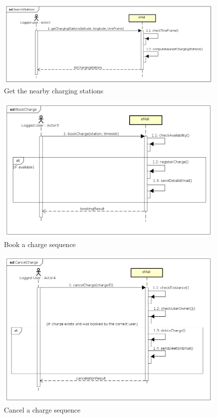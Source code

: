 \begin{figure}[!h]
    \begin{center}
        \includegraphics[keepaspectratio, width=16cm]{Sequence/SearchStations.png}
        \caption{Get the nearby charging stations}
    \end{center}
\end{figure}
\begin{figure}[!h]
    \begin{center}
        \includegraphics[keepaspectratio, width=16cm]{Sequence/BookCharge.png}
        \caption{Book a charge sequence}
    \end{center}
\end{figure}
\begin{figure}[!h]
    \begin{center}
        \includegraphics[keepaspectratio, width=16cm]{Sequence/CancelCharge.png}
        \caption{Cancel a charge sequence}
    \end{center}
\end{figure}

